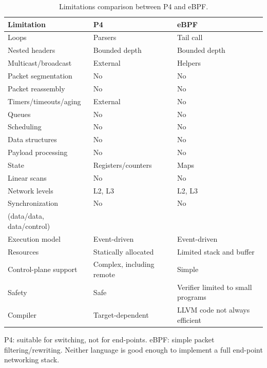 \begin{table}[h]
  \begin{center}
  \begin{tabular}{|l|l|l|} \hline
    \textbf{Limitation} & \textbf{P4} & \textbf{eBPF} \\ \hline \hline
    Loops & Parsers & Tail call \\ \hline
    Nested headers & Bounded depth & Bounded depth \\ \hline
    Multicast/broadcast & External & Helpers \\ \hline
    Packet segmentation & No & No \\ \hline
    Packet reassembly &	No & No \\ \hline
    Timers/timeouts/aging & External & No \\ \hline
    Queues & No & No \\ \hline
    Scheduling & No & No \\ \hline
    Data structures & No & No \\ \hline
    Payload processing & No & No \\ \hline
    State & Registers/counters & Maps \\ \hline
    Linear scans & No & No \\ \hline
    Network levels & L2, L3 & L2, L3 \\ \hline
    Synchronization & No & No \\
    (data/data, data/control) & & \\ \hline
    Execution model & Event-driven & Event-driven \\ \hline
    Resources & Statically allocated & Limited stack and buffer \\ \hline
    Control-plane support & Complex, including remote & Simple \\ \hline
    Safety & Safe & Verifier limited to small programs \\ \hline
    Compiler & Target-dependent & LLVM code not always efficient \\ \hline
  \end{tabular}
  \caption{Limitations comparison between P4 and eBPF.}\label{table:limitations}
  \end{center}
\end{table}

P4: suitable for switching, not for end-points.
eBPF: simple packet filtering/rewriting.
Neither language is good enough to implement a full end-point networking stack.
